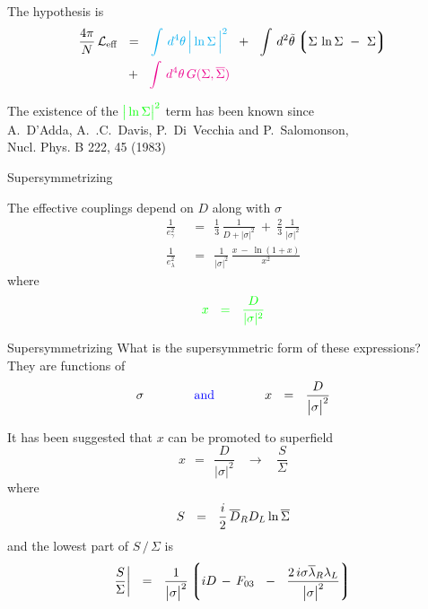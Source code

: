 \documentclass{beamer}
\begin{document}
\begin{frame}
The hypothesis is
\begin{align*}
%
	\frac{4\pi}{N}\, \cell_\text{eff}    & ~~=~~     
			\textcolor{cyan}{\int\, d^4\theta\, \Big| \ln \Sigma \, \Big|^2}
			~~+~~
			\int\, d^2\tilde\theta 
			\lgr
			\Sigma\, \ln \Sigma  ~-~ \Sigma
			\rgr
	\\
%
	&
	~~+~~ \textcolor{magenta}{\int\, d^4\theta\, G(\Sigma,\ov\Sigma)}
\end{align*}

	The existence of the $ \textcolor{green}{\big| \ln\Sigma \big|^2} $ term has been known since\\
	{\sc A.~D'Adda, A.~.C.~Davis, P.~Di~Vecchia and P.~Salomonson,\\
	     Nucl. Phys. B 222, 45 (1983)}

\end{frame}


\begin{frame}{Supersymmetrizing}

	The effective couplings depend on $ D $ along with $ \sigma $
\begin{align*}
%
	\frac{1}{e_\gamma^2}  & ~~=~~
					\frac{1}{3}\,\frac{1}{D + |\sigma|^2}  ~+~
					\frac{2}{3}\,\frac{1}{|\sigma|^2}
	\\[2mm]
%
	\frac{1}{e_\lambda^2}  & ~~=~~
					\frac{1}{|\sigma|^2}\, \frac{ x ~-~ \ln(1 + x) }{x^2}
\end{align*}
	where
\[
\textcolor{green}
{
	x  ~~=~~  \frac{D}{|\sigma|^2}
}
\]
\end{frame}


\begin{frame}{Supersymmetrizing}
	What is the supersymmetric form of these expressions?\\[2mm]

	They are functions of 
\[
	\sigma \qquad\qquad\text{\textcolor{blue}{and}}\qquad\qquad x    ~~=~~    \frac{D}{\big|\sigma\big|^2}
\]
\end{frame}


\begin{frame}{}

	It has been suggested that $ x $ can be promoted to superfield
\[
	x    ~~=~~    \frac{D}{\big|\sigma\big|^2}    ~~~~\longrightarrow~~~~
		\frac{S}{\Sigma}
\]
	where 
\[
	S    ~~=~~    \frac{i}{2}\,\overline D{}_R D_L \ln \overline\Sigma
\]
	and the lowest part of $ S \,/\, \Sigma $ is
\[
	\frac{S}{\Sigma} \bigg|    ~~=~~
		\frac{1}{\big|\sigma\big|^2}
		\left\lgroup
			iD \,-\, F_{03}
			~~-~~
			\frac{2\, i\sigma \overline\lambda{}_R\lambda_L}{\big|\sigma\big|^2}
		\right\rgroup
\]
\end{frame}
\end{document}
